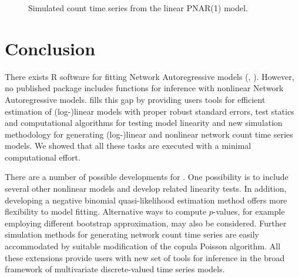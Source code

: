 \begin{figure}[H]
	\centering
	\caption{Simulated count time series from the linear PNAR(1) model.}
	\label{simulation}
\end{figure}



\section{Conclusion}
\label{sec. Discussion}

There exists R software for fitting Network Autoregressive models (, ). However, no published package includes functions for  inference with nonlinear Network Autoregressive models. 
 fills this  gap by providing users tools for  efficient estimation of (log-)linear models with proper robust 
standard errors, test statics and computational algorithms  for  testing model linearity 
and new simulation methodology for generating  (log-)linear and nonlinear network count time series models. 
We showed that all these tasks are executed  with a minimal computational effort.


There are a number of possible developments for . One possibility is to include several other nonlinear models and develop related linearity tests. In addition, developing a negative binomial quasi-likelihood estimation method offers more flexibility to model fitting.  Alternative ways to compute $p$-values, for example employing different bootstrap approximation, may also be considered.  Further simulation methods for generating network count time series are easily accommodated by suitable modification of the copula Poisson algorithm.  All these extensions provide users with new set of tools for inference in the broad framework of multivariate discrete-valued time series models. 



